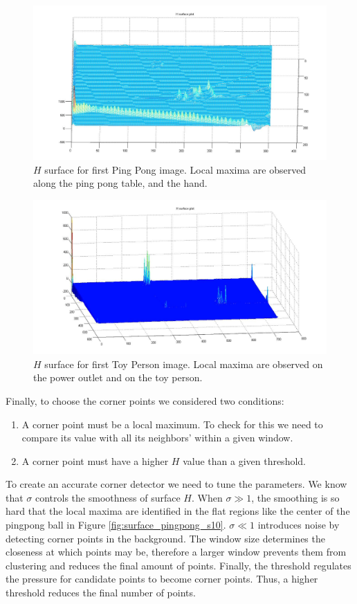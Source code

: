 \documentclass[11pt]{article}
\begin{document}
\begin{figure}[H] \centering
	\includegraphics[width=.8\textwidth]{imgs/surface_pingpong.jpg}
	\caption{$H$ surface for first Ping Pong image. Local maxima are
		observed along the ping pong table, and the hand.}
	\label{fig:surface_pingpong}
\end{figure}

\begin{figure}[H] \centering
	\includegraphics[width=.8\textwidth]{imgs/surface_person.jpg}
	\caption{$H$ surface for first Toy Person image. Local maxima are
		observed on the power outlet and on the toy person.}
	\label{fig:surface_person}
\end{figure}

Finally, to choose the corner points we considered two conditions:
\begin{enumerate} 
	\item A corner point must be a local maximum. To check for
		this we need to compare its value with all its neighbors' within
		a given window.
	\item A corner point must have a higher $H$
		value than a given threshold.
\end{enumerate}

To create an accurate corner detector we need to tune the parameters. We know
that $\sigma$ controls the smoothness of surface $H$. When $\sigma \gg 1$, the
smoothing is so hard that the local maxima are identified in the flat regions
like the center of the pingpong ball in Figure \ref{fig:surface_pingpong_s10}.  
$\sigma \ll 1$ introduces noise by detecting corner points in the background. The
window size determines the closeness at which points may be, therefore a larger
window prevents them from clustering and reduces the final amount of points.
Finally, the threshold regulates the pressure for candidate points to become
corner points. Thus, a higher threshold reduces the final number of points.
\end{document}
